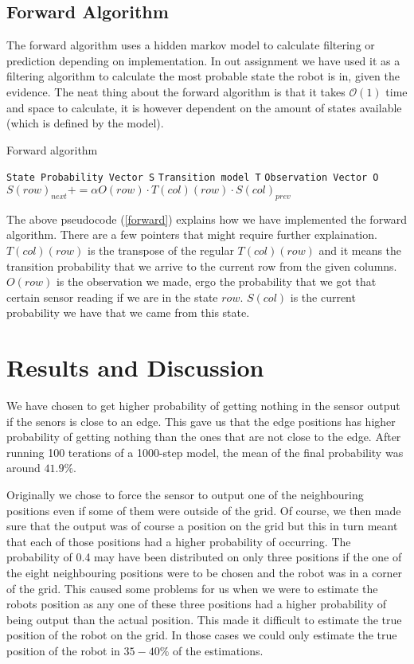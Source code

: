 \documentclass[a4paper]{article}
\begin{document}
\subsection{Forward Algorithm}
\label{for_alg}
The forward algorithm uses a hidden markov model to calculate filtering or prediction depending on implementation. In out assignment we have used it as a filtering algorithm to calculate the most probable state the robot is in, given the evidence. The neat thing about the forward algorithm is that it takes $\mathcal{O}(1)$ time and space to calculate, it is however dependent on the amount of states available (which is defined by the model). 

\begin{algorithm}
  \caption{Forward algorithm}\label{forward}
  \begin{algorithmic}[1]
      \State \texttt{State Probability Vector S}
      \State \texttt{Transition model T}
      \State \texttt{Observation Vector O}
      		\State $S(row)_{next} += \alpha O(row) \cdot T(col)(row) \cdot S(col)_{prev}$
      	\EndFor
      \EndFor
  \end{algorithmic}
\end{algorithm}

The above pseudocode (\ref{forward}) explains how we have implemented the forward algorithm. There are a few pointers that might require further explaination. $T(col)(row)$ is the transpose of the regular $T(col)(row)$ and it means the transition probability that we arrive to the current row from the given columns. $O(row)$ is the observation we made, ergo the probability that we got that certain sensor reading if we are in the state $row$. $S(col)$ is the current probability we have that we came from this state.

\section{Results and Discussion}
We have chosen to get higher probability of getting nothing in the sensor output if the senors is close to an edge. This gave us that the edge positions has higher probability of getting nothing than the ones that are not close to the edge. 
After running 100 terations of a 1000-step model, the mean of the final probability was around $41.9\%$.


Originally we chose to force the sensor to output one of the neighbouring positions even if some of them were outside of the grid. Of course, we then made sure that the output was of course a position on the grid but this in turn meant that each of those positions had a higher probability of occurring. The probability of 0.4 may have been distributed on only three positions if the one of the eight neighbouring positions were to be chosen and the robot was in a corner of the grid. This caused some problems for us when we were to estimate the robots position as any one of these three positions had a higher probability of being output than the actual position. This made it difficult to estimate the true position of the robot on the grid. In those cases we could only estimate the true position of the robot in $35 - 40\%$ of the estimations.
\end{document}
